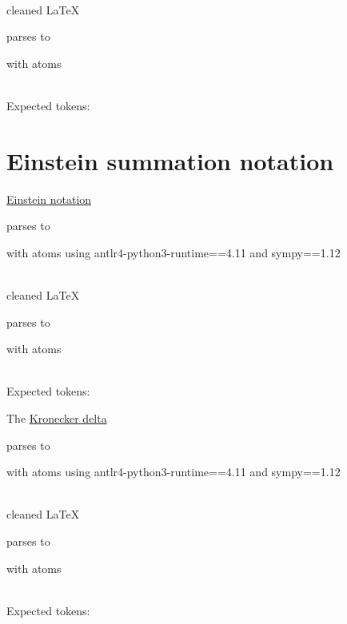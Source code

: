 \documentclass{article}
\begin{document}
\ \\
cleaned \LaTeX

parses to

with atoms


\ \\
Expected tokens:



\hrulefill


\section{Einstein summation notation}


\href{https://en.wikipedia.org/wiki/Einstein_notation}{Einstein notation}


parses to

with atoms
using antlr4-python3-runtime==4.11 and sympy==1.12

\ \\
cleaned \LaTeX

parses to

with atoms


\ \\
Expected tokens:



\hrulefill


The \href{https://en.wikipedia.org/wiki/Kronecker_delta}{Kronecker delta}

parses to

with atoms
using antlr4-python3-runtime==4.11 and sympy==1.12

\ \\
cleaned \LaTeX

parses to

with atoms


\ \\
Expected tokens:

\end{document}
